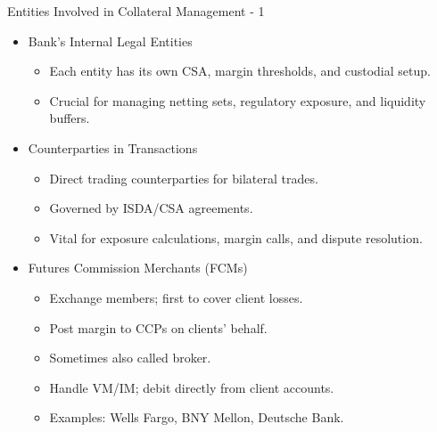 \documentclass[handout, aspectratio=169]{beamer}
\begin{document}
\begin{frame}{Entities Involved in Collateral Management - 1}
  \begin{itemize}
    \item Bank's Internal Legal Entities
    \begin{itemize}
      \item Each entity has its own CSA, margin thresholds, and custodial setup.
      \item Crucial for managing netting sets, regulatory exposure, and liquidity buffers.
    \end{itemize}
    \item Counterparties in Transactions
    \begin{itemize}
      \item Direct trading counterparties for bilateral trades.
      \item Governed by ISDA/CSA agreements.
      \item Vital for exposure calculations, margin calls, and dispute resolution.
    \end{itemize}
    \item Futures Commission Merchants (FCMs)
    \begin{itemize}
      \item Exchange members; first to cover client losses.
      \item Post margin to CCPs on clients' behalf.
      \item Sometimes also called broker.
      \item Handle VM/IM; debit directly from client accounts.
      \item Examples: Wells Fargo, BNY Mellon, Deutsche Bank.
    \end{itemize}
  \end{itemize}
\end{frame}
\end{document}
